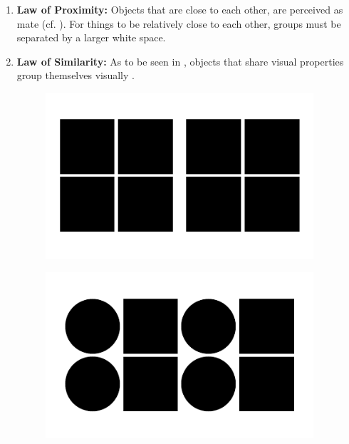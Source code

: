 \begin{enumerate}
    \item \textbf{Law of Proximity:} Objects that are close to each other, are perceived as mate (cf. ). For things to be relatively close to each other, groups must be separated by a larger white space. \parencite{Seogaard.n.y.}
    \item \textbf{Law of Similarity:} As to be seen in , objects that share visual properties group themselves visually \parencite[cf.][2]{Bakar.2017}.
    \begin{figure}[H] 
        \begin{minipage}[b]{.5\linewidth}
            \centering\includegraphics[width=0.94\textwidth]{img/proximity.pdf}
            \label{fig:prox}
        \end{minipage}%
        \begin{minipage}[b]{.5\linewidth}
            \centering\includegraphics[width=0.94\textwidth]{img/similarity.pdf}
            \label{fig:sim}
        \end{minipage}

\end{figure}
\end{enumerate}
